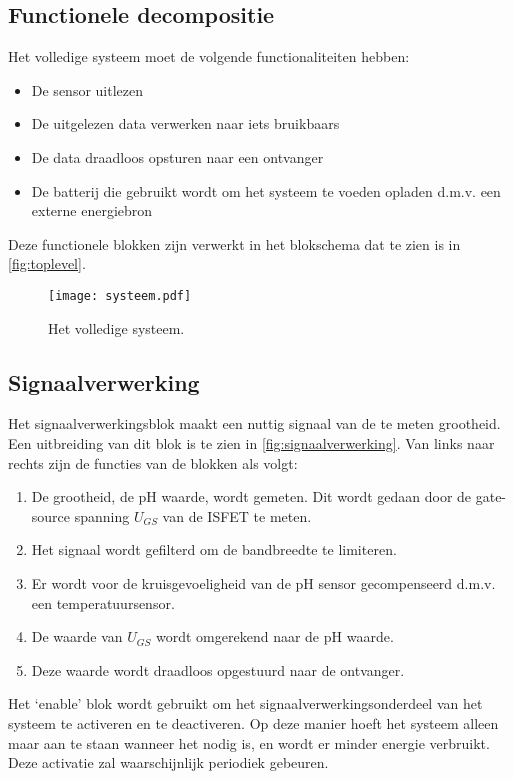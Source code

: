 \subsection{Functionele decompositie}
Het volledige systeem moet de volgende functionaliteiten hebben:

\begin{itemize}
    \item De sensor uitlezen
    \item De uitgelezen data verwerken naar iets bruikbaars
    \item De data draadloos opsturen naar een ontvanger
    \item De batterij die gebruikt wordt om het systeem te voeden opladen d.m.v. een externe energiebron
\end{itemize}
Deze functionele blokken zijn verwerkt in het blokschema dat te zien is in \autoref{fig:toplevel}.

\begin{figure}[ht]
    \centering
    \texttt{[image: systeem.pdf]}
    \caption{Het volledige systeem.} 
    \label{fig:toplevel}
\end{figure}

\subsection{Signaalverwerking}
Het signaalverwerkingsblok maakt een nuttig signaal van de te meten grootheid. Een uitbreiding van dit blok is te zien in \autoref{fig:signaalverwerking}.
Van links naar rechts zijn de functies van de blokken als volgt:
\begin{enumerate}
    \item De grootheid, de pH waarde, wordt gemeten. Dit wordt gedaan door de gate-source spanning $U_{GS}$ van de ISFET te meten.
    \item Het signaal wordt gefilterd om de bandbreedte te limiteren.
    \item Er wordt voor de kruisgevoeligheid van de pH sensor gecompenseerd d.m.v. een temperatuursensor.
    \item De waarde van $U_{GS}$ wordt omgerekend naar de pH waarde.
    \item Deze waarde wordt draadloos opgestuurd naar de ontvanger.
\end{enumerate}
Het `enable' blok wordt gebruikt om het signaalverwerkingsonderdeel van het systeem te activeren en te deactiveren. Op deze manier hoeft het systeem alleen maar aan te staan wanneer het nodig is, en wordt er minder energie verbruikt. Deze activatie zal waarschijnlijk periodiek gebeuren.


